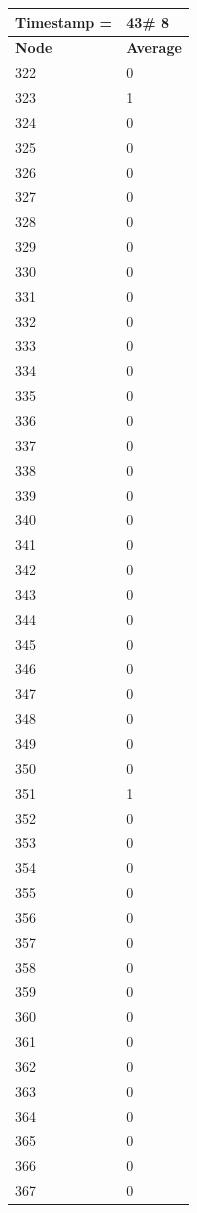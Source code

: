 \begin{tabular}{|l||l|}
\hline
\textbf{Timestamp =} & \textbf{43}\# 8\\\hline
	\textbf{Node} & \textbf{Average} \\ \hline
\hline
	322 & 0 \\ \hline
	323 & 1 \\ \hline
	324 & 0 \\ \hline
	325 & 0 \\ \hline
	326 & 0 \\ \hline
	327 & 0 \\ \hline
	328 & 0 \\ \hline
	329 & 0 \\ \hline
	330 & 0 \\ \hline
	331 & 0 \\ \hline
	332 & 0 \\ \hline
	333 & 0 \\ \hline
	334 & 0 \\ \hline
	335 & 0 \\ \hline
	336 & 0 \\ \hline
	337 & 0 \\ \hline
	338 & 0 \\ \hline
	339 & 0 \\ \hline
	340 & 0 \\ \hline
	341 & 0 \\ \hline
	342 & 0 \\ \hline
	343 & 0 \\ \hline
	344 & 0 \\ \hline
	345 & 0 \\ \hline
	346 & 0 \\ \hline
	347 & 0 \\ \hline
	348 & 0 \\ \hline
	349 & 0 \\ \hline
	350 & 0 \\ \hline
	351 & 1 \\ \hline
	352 & 0 \\ \hline
	353 & 0 \\ \hline
	354 & 0 \\ \hline
	355 & 0 \\ \hline
	356 & 0 \\ \hline
	357 & 0 \\ \hline
	358 & 0 \\ \hline
	359 & 0 \\ \hline
	360 & 0 \\ \hline
	361 & 0 \\ \hline
	362 & 0 \\ \hline
	363 & 0 \\ \hline
	364 & 0 \\ \hline
	365 & 0 \\ \hline
	366 & 0 \\ \hline
	367 & 0 \\ \hline
\end{tabular}
